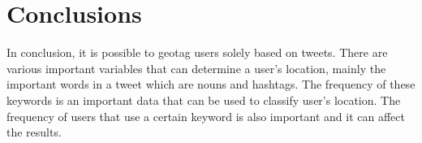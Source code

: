 \documentclass[11pt]{article}
\begin{document}
\section{Conclusions}

In conclusion, it is possible to geotag users solely based on tweets. There are
various important variables that can determine a user's location, mainly the
important words in a tweet which are nouns and hashtags. 
The frequency of these keywords is an important data
that can be used to classify user's location. The frequency of users that use a
certain keyword is also important and it can affect the results. 

\newpage



\end{document}
